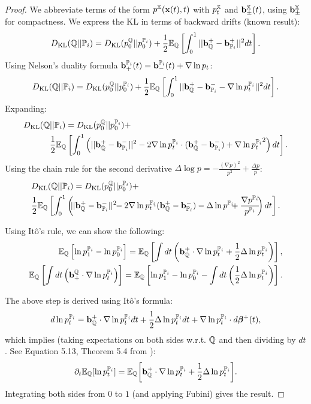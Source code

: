 \documentclass[a4paper,12pt,twoside,openright]{report}
\theoremstyle{definition}
\begin{document}
\begin{proof}
We  abbreviate  terms of the form $p^{{\mathbb{X}}}({\mathbf{x}}(t), t)$ with $p^{{\mathbb{X}}}_t$ and ${\mathbf{b}}^{{\mathbb{X}}}_{\pm}(t)$, using ${\mathbf{b}}^{{\mathbb{X}}}_{\pm}$ for compactness. We express the KL in terms of backward drifts (known result):
\begin{align}
D_{\mathrm{KL}}({\mathbb{Q}}||{{\mathbb{P}}_{i}}) = D_{\mathrm{KL}}( p_0^{{\mathbb{Q}}}|| p_0^{{{\mathbb{P}}_{i}}}) + \frac{1}{2}\mathbb{E}_{{\mathbb{Q}}}\left[\int_0^1 || {\mathbf{b}}_{\mathbb{Q}}^{+} -{\mathbf{b}}_{{\mathbb{P}}_{i}}^{+}||^2 dt\right].
\end{align}
Using Nelson's duality formula ${\mathbf{b}}^{{\mathbb{P}}_{i}}_+(t) ={\mathbf{b}}^{{\mathbb{P}}_{i}}_-(t) + \nabla\operatorname{ln} p_t$:
\begin{align}
D_{\mathrm{KL}}({\mathbb{Q}}||{{\mathbb{P}}_{i}}) = D_{\mathrm{KL}}( p_0^{{\mathbb{Q}}}|| p_0^{{{\mathbb{P}}_{i}}}) + \frac{1}{2}\mathbb{E}_{{\mathbb{Q}}}\left[\int_0^1 || {\mathbf{b}}_{\mathbb{Q}}^{+} - {\mathbf{b}}_{{\mathbb{P}}_{i}}^{-} - \nabla\operatorname{ln} p_t^{{\mathbb{P}}_{i}}||^2 dt\right].
\end{align}
Expanding:
\begin{align*}
D_{\mathrm{KL}}({\mathbb{Q}}&||{{\mathbb{P}}_{i}}) = D_{\mathrm{KL}}( p_0^{{\mathbb{Q}}}|| p_0^{{{\mathbb{P}}_{i}}}) +\\ &\frac{1}{2}\mathbb{E}_{{\mathbb{Q}}}\left[\int_0^1 \left(|| {\mathbf{b}}_{\mathbb{Q}}^{+} - {\mathbf{b}}_{{\mathbb{P}}_{i}}^{-}||^2 - 2\nabla\operatorname{ln} p_t^{{\mathbb{P}}_{i}} \cdot ( {\mathbf{b}}_{\mathbb{Q}}^{+} - {\mathbf{b}}_{{\mathbb{P}}_{i}}^{-}) + {\nabla\operatorname{ln} p_t^{{\mathbb{P}}_{i}}}^2 \right)dt\right].
\end{align*}
Using the chain rule for the second derivative $\Delta \log  p = -\frac{(\nabla p)^2}{ p^2}  + \frac{\Delta  p}{ p}$:
\begin{align*}
&\KL(\Q||{\P_{i}}) =\KL( p_0^{\Q}|| p_0^{{\P_{i}}}) +\\ &\frac{1}{2}\E_{\Q}\left[\int_0^1 \left(\!\!|| \rvb_\Q^{+} - \rvb_{\P_{i}}^{-}||^2 \!\!- 2\nabla\log p_t^{\P_{i}}\!\!\!\cdot \!( \rvb_\Q^{+} - \rvb_{\P_{i}}^{-}) - \Delta \log  p^{\P_{i}}\!\!\!+ \frac{\nabla  p^{\P_{i}}}{ p^{\P_{i}}}\!\!\right)dt\right].
\end{align*}

Using Itô's rule, we can show the following: 
\begin{align*}
\mathbb{E}_{\mathbb{Q}}\left[\operatorname{ln} p^{{\mathbb{P}}_{i}}_1-\operatorname{ln} p^{{\mathbb{P}}_{i}}_0\right] = \mathbb{E}_{\mathbb{Q}}\left[\int dt \left({\mathbf{b}}^+_{\mathbb{Q}}\cdot\nabla\operatorname{ln} p_t^{{\mathbb{P}}_{i}} + \frac{1}{2}\Delta \operatorname{ln} p_t^{{\mathbb{P}}_{i}}\right)\right],\\
\mathbb{E}_{\mathbb{Q}}\left[\int dt \left({\mathbf{b}}_+^{\mathbb{Q}}\cdot\nabla\operatorname{ln} p_t^{{\mathbb{P}}_{i}} \right)\right] = \mathbb{E}_{\mathbb{Q}}\left[\operatorname{ln} p^{{\mathbb{P}}_{i}}_1-\operatorname{ln} p^{{\mathbb{P}}_{i}}_0 - \int dt \left( \frac{1}{2}\Delta \operatorname{ln} p_t^{{\mathbb{P}}_{i}}\right)\right].
\end{align*}

The above step is derived using Itô's formula:
\begin{align*}
d\operatorname{ln}  p_t^{{{\mathbb{P}}_{i}}} ={\mathbf{b}}^+_{\mathbb{Q}}\cdot\nabla\operatorname{ln} p_t^{{\mathbb{P}}_{i}} dt + \frac{1}{2}\Delta \operatorname{ln} p_t^{{\mathbb{P}}_{i}} dt + \nabla \operatorname{ln} p_t^{{\mathbb{P}}_{i}} \cdot d{\bm{\beta}}^{+}(t),
\end{align*}
which implies (taking expectations on both sides w.r.t. ${\mathbb{Q}}$ and then dividing by $dt$. See Equation 5.13, Theorem 5.4 from \cite{sarkka2019applied}):
\begin{align*}
\partial_t \mathbb{E}_{{\mathbb{Q}}}[\operatorname{ln}  p_t^{{{\mathbb{P}}_{i}}}] = \mathbb{E}_{{\mathbb{Q}}}{\left[{\mathbf{b}}^+_{\mathbb{Q}}\cdot\nabla\operatorname{ln} p_t^{{\mathbb{P}}_{i}} + \frac{1}{2}\Delta \operatorname{ln} p_t^{{\mathbb{P}}_{i}}\right]}.
\end{align*}
Integrating both sides from $0$ to $1$ (and applying Fubini) gives the result.


\end{proof}
\end{document}
